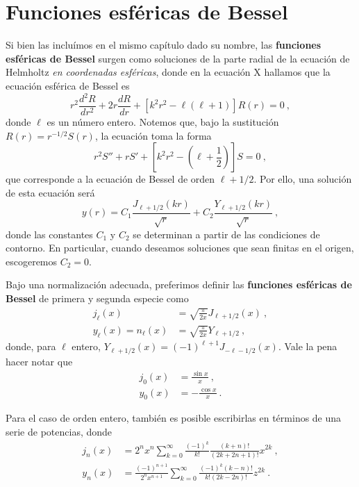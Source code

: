 \section{Funciones esféricas de Bessel}

Si bien las incluímos en el mismo capítulo dado su nombre, las \textbf{funciones esféricas de Bessel} surgen como soluciones de la parte radial de la ecuación de Helmholtz \emph{en coordenadas esféricas}, donde en la ecuación X hallamos que la ecuación esférica de Bessel es
\begin{equation}
    r^2 \frac{d^2R}{dr^2} + 2r \frac{dR}{dr} + [k^2 r^2 - \ell (\ell+1)]R(r) = 0 \ ,
\end{equation}
donde $\ell$ es un número entero. Notemos que, bajo la sustitución $R(r) = r^{-1/2} S(r)$, la ecuación toma la forma
\begin{equation}
    r^2 S'' + rS' + \left[k^2r^2 - \left(\ell + \frac{1}{2}\right)\right]S = 0 \ ,
\end{equation}
que corresponde a la ecuación de Bessel de orden $\ell + 1/2$. Por ello, una solución de esta ecuación será
\begin{equation}
    y(r) = C_1 \frac{J_{\ell + 1/2}(kr)}{\sqrt{r}} + C_2 \frac{Y_{\ell + 1/2}(kr)}{\sqrt{r}} \ ,
\end{equation}
donde las constantes $C_1$ y $C_2$ se determinan a partir de las condiciones de contorno. En particular, cuando deseamos soluciones que sean finitas en el origen, escogeremos $C_2 = 0$.

Bajo una normalización adecuada, preferimos definir las \textbf{funciones esféricas de Bessel} de primera y segunda especie como
\begin{align}
    j_\ell (x) & = \sqrt{\frac{\pi}{2x}} J_{\ell + 1/2}(x) \ , \\
    y_\ell (x) = n_\ell(x) & = \sqrt{\frac{\pi}{2x}} Y_{\ell + 1/2} \ ,
\end{align}
donde, para $\ell$ entero, $Y_{\ell + 1/2}(x) = (-1)^{\ell + 1}J_{-\ell - 1/2}(x)$. Vale la pena hacer notar que
\begin{align}
    j_0(x) & = \frac{\sin x}{x} \ , \\
    y_0(x) & = - \frac{\cos x}{x} \ .
\end{align}

Para el caso de orden entero, también es posible escribirlas en términos de una serie de potencias, donde
\begin{align}
    j_n(x) & = 2^n x^n  \sum_{k=0}^\infty \frac{(-1)^k}{k!} \frac{(k+n)!}{(2k+2n+1)!}x^{2k} \ , \\
    y_n(x) & = \frac{(-1)^{n+1}}{2^n x^{n+1}} \sum_{k = 0}^\infty \frac{(-1)^k (k-n)!}{k! (2k-2n)!}z^{2k} \ .
\end{align}

